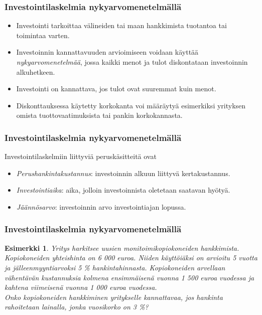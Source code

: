 \documentclass[]{beamer}\usepackage[]{graphicx}\usepackage[]{color}
\newtheorem{esim}{Esimerkki}
\newcommand{\pblock}{\\ \vspace{0.5cm}\pause}
\begin{document}
\begin{frame}
    \frametitle{Investointilaskelmia nykyarvomenetelmällä}
    \begin{itemize}
        \item {Investointi} tarkoittaa välineiden tai maan hankkimista tuotantoa tai toimintaa varten. \pause
        \item Investoinnin kannattavuuden arvioimiseen voidaan käyttää \emph{nykyarvomenetelmää}, jossa kaikki menot ja tulot diskontataan investoinnin alkuhetkeen.  \pause
        \item Investointi on kannattava, jos tulot ovat suuremmat kuin menot. \pause
        \item Diskonttauksessa käytetty korkokanta voi määräytyä esimerkiksi yrityksen omista tuottovaatimuksista tai pankin korkokannasta.
    \end{itemize}
\end{frame}

\begin{frame}
    \frametitle{Investointilaskelmia nykyarvomenetelmällä}
    Investointilaskelmiin liittyviä peruskäsitteitä ovat \pause
    \begin{itemize}
        \item \emph{Perushankintakustannus}: investoinnin alkuun liittyvä kertakustannus. \pause
        \item \emph{Investointiaika}: aika, jolloin investoinnista oletetaan saatavan hyötyä. \pause
        \item \emph{Jäännösarvo}: investoinnin arvo investointiajan lopussa.
    \end{itemize}
\end{frame}

\begin{frame}
\frametitle{Investointilaskelmia nykyarvomenetelmällä}
    \begin{esim}
    Yritys harkitsee uusien monitoimikopiokoneiden hankkimista.
    Kopiokoneiden yhteishinta on 6 000 euroa. Niiden käyttöiäksi on arvioitu 5 vuotta ja jälleenmyyntiarvoksi 5 \% hankintahinnasta.
    Kopiokoneiden arvellaan vähentävän kustannuksia kolmena ensimmäisenä vuonna 1 500 euroa vuodessa ja kahtena viimeisenä vuonna 1 000 euroa vuodessa.
    \pblock
    Onko kopiokoneiden hankkiminen yritykselle kannattavaa, jos hankinta rahoitetaan lainalla, jonka vuosikorko on 3 \%?
    \end{esim}
\end{frame}
\end{document}
